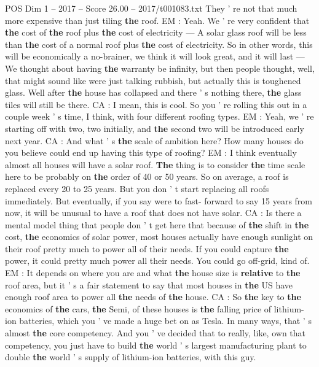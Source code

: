 \begin{textsample}{POS Dim 1 – 2017 – Score 26.00 – 2017/t001083.txt}
They ' re not that much more expensive than just tiling \textbf{the} roof.
EM : Yeah.
We ' re very confident that \textbf{the} cost of \textbf{the} roof plus \textbf{the} cost of electricity — A solar glass roof will be less than \textbf{the} cost of a normal roof plus \textbf{the} cost of electricity.
So in other words, this will be economically a no-brainer, we think it will look great, and it will last — We thought about having \textbf{the} warranty be infinity, but then people thought, well, that might sound like were just talking rubbish, but actually this is toughened glass.
Well after \textbf{the} house has collapsed and there ' s nothing there, \textbf{the} glass tiles will still be there.
CA : I mean, this is cool.
So you ' re rolling this out in a couple week ' s time, I think, with four different roofing types.
EM : Yeah, we ' re starting off with two, two initially, and \textbf{the} second two will be introduced early next year.
CA : And what ' s \textbf{the} scale of ambition here?
How many houses do you believe could end up having this type of roofing?
EM : I think eventually almost all houses will have a solar roof. \textbf{The} thing is to consider \textbf{the} time scale here to be probably on \textbf{the} order of 40 or 50 years.
So on average, a roof is replaced every 20 to 25 years.
But you don ' t start replacing all roofs immediately.
But eventually, if you say were to fast- forward to say 15 years from now, it will be unusual to have a roof that does not have solar.
CA : Is there a mental model thing that people don ' t get here that because of \textbf{the} shift in \textbf{the} cost, \textbf{the} economics of solar power, most houses actually have enough sunlight on their roof pretty much to power all of their needs.
If you could capture \textbf{the} power, it could pretty much power all their needs.
You could go off-grid, kind of.
EM : It depends on where you are and what \textbf{the} house size is \textbf{relative} to \textbf{the} roof area, but it ' s a fair statement to say that most houses in \textbf{the} US have enough roof area to power all \textbf{the} needs of \textbf{the} house.
CA : So \textbf{the} key to \textbf{the} economics of \textbf{the} cars, \textbf{the} Semi, of these houses is \textbf{the} falling price of lithium-ion batteries, which you ' ve made a huge bet on as Tesla.
In many ways, that ' s almost \textbf{the} core competency.
And you ' ve decided that to really, like, own that competency, you just have to build \textbf{the} world ' s largest manufacturing plant to double \textbf{the} world ' s supply of lithium-ion batteries, with this guy.

\end{textsample}
